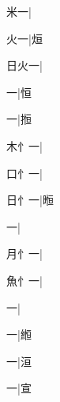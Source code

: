 \begin{multicols}{2}
{{\cjk{}{\cnsym{}　}米一}|{}\par
{\cjk{}{\cnsym{}　}火一}|{\cjk{}烜}\par
{\cjk{}日火一}|{}\par
{一}|{\cjk{}恒}\par
{一}|{\cjk{}搄}\par
{\cjk{}木{忄}一}|{}\par
{\cjk{}口{忄}一}|{}\par
{\cjk{}日{忄}一}|{\cjk{}暅}\par
{一}|{}\par
{\cjk{}月{忄}一}|{}\par
{\cjk{}魚{忄}一}|{}\par
{一}|{}\par
{一}|{\cjk{}縆}\par
{一}|{\cjk{}洹}\par
{一}|{\cjk{}宣}\par
}
\end{multicols}
